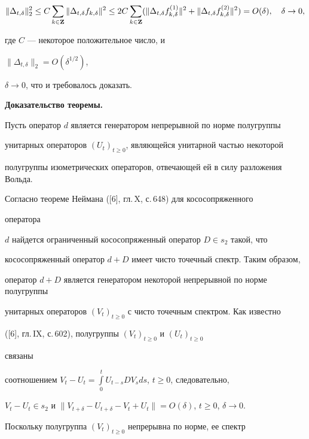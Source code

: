 \begin{pf}
$$


\|\Delta_{t,\delta}\|^2_2\leq C\sum \limits_{k\in \bold Z}


\|\Delta_{t,\delta}f_{k,\delta}\|^2\leq


2C\sum \limits_{k\in \bold Z}(\|\Delta_{t,\delta}f_{k,\delta}^{(1)}\|^2+


\|\Delta_{t,\delta}f_{k,\delta}^{(2)}\|^2)=O(\delta),\quad \delta \to 0,


$$


где $C$ --- некоторое положительное число, и


$\|\Delta_{t,\delta}\|_2=O({\delta}^{1/2})$,


$\delta \to 0$, что и требовалось доказать.


\end{pf}





{\bf Доказательство теоремы.}


Пусть оператор $d$ является генератором непрерывной по норме полугруппы


унитарных операторов $(U_t)_{t\geq 0}$, являющейся унитарной частью некоторой


полугруппы изометрических операторов, отвечающей ей в силу разложения Вольда.


Согласно теореме Неймана ([6], гл.\,X, с.\,648) для кососопряженного


оператора


$d$ найдется ограниченный кососопряженный оператор $D\in s_2$ такой, что


кососопряженный оператор $d+D$ имеет чисто точечный спектр. Таким образом,


оператор $d+D$ является генератором некоторой непрерывной по норме полугруппы


унитарных операторов $(V_t)_{t\geq 0}$ с чисто точечным спектром. Как известно


([6], гл.\,IX, с.\,602), полугруппы $(V_t)_{t\geq 0}$ и $(U_t)_{t\geq 0}$


связаны


соотношением $V_t-U_t=\int\limits_0^tU_{t-s}DV_sds$, $t\geq 0$, следовательно,


$V_t-U_t\in s_2$ и $\|V_{t+\delta}-U_{t+\delta}-V_t+


U_t\|=O(\delta)$, $t\geq 0$, $\delta \to 0$.





Поскольку полугруппа $(V_t)_{t\geq 0}$ непрерывна по норме, ее спектр


